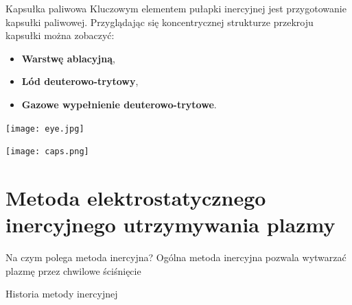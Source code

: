\documentclass[10pt]{beamer}
\begin{document}
        \begin{frame}{Kapsułka paliwowa}
            Kluczowym elementem pułapki inercyjnej jest przygotowanie kapsułki paliwowej.
            Przyglądając się koncentrycznej strukturze przekroju kapsułki można zobaczyć:
            \begin{itemize}
                \item \textbf{Warstwę ablacyjną},
                \item \textbf{Lód deuterowo-trytowy},
                \item \textbf{Gazowe wypełnienie deuterowo-trytowe}.
            \end{itemize}
            \begin{minipage}{0.49\textwidth}
                \centering
                \texttt{[image: eye.jpg]}
            \end{minipage}
            \hfill
            \begin{minipage}{0.49\textwidth}
                \centering
                \texttt{[image: caps.png]}
            \end{minipage}
        \end{frame}

    \section{Metoda elektrostatycznego inercyjnego utrzymywania plazmy}

    \begin{frame}{Na czym polega metoda inercyjna?}
        Ogólna metoda inercyjna pozwala wytwarzać plazmę przez chwilowe ściśnięcie 
    \end{frame}

    \begin{frame}{Historia metody inercyjnej}

    \end{frame}
\end{document}
